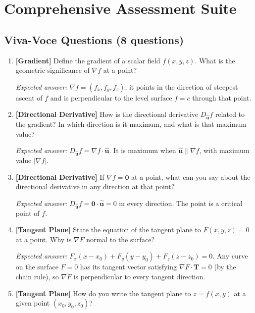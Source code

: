 \documentclass[12pt,a4paper]{article}
\begin{document}
\section{Comprehensive Assessment Suite}

\subsection*{Viva-Voce Questions (8 questions)}

\begin{enumerate}[leftmargin=*, label=\textbf{Q\arabic*.}]
  \item \textbf{[Gradient]} Define the gradient of a scalar field $f(x,y,z)$. What is the geometric significance of $\nabla f$ at a point?

  \textit{Expected answer:} $\nabla f = (f_x, f_y, f_z)$; it points in the direction of steepest ascent of $f$ and is perpendicular to the level surface $f = c$ through that point.

  \item \textbf{[Directional Derivative]} How is the directional derivative $D_{\hat{\mathbf{u}}} f$ related to the gradient? In which direction is it maximum, and what is that maximum value?

  \textit{Expected answer:} $D_{\hat{\mathbf{u}}} f = \nabla f \cdot \hat{\mathbf{u}}$. It is maximum when $\hat{\mathbf{u}} \parallel \nabla f$, with maximum value $|\nabla f|$.

  \item \textbf{[Directional Derivative]} If $\nabla f = \mathbf{0}$ at a point, what can you say about the directional derivative in any direction at that point?

  \textit{Expected answer:} $D_{\hat{\mathbf{u}}} f = \mathbf{0} \cdot \hat{\mathbf{u}} = 0$ in every direction. The point is a critical point of $f$.

  \item \textbf{[Tangent Plane]} State the equation of the tangent plane to $F(x,y,z) = 0$ at a point. Why is $\nabla F$ normal to the surface?

  \textit{Expected answer:} $F_x(x-x_0)+F_y(y-y_0)+F_z(z-z_0)=0$. Any curve on the surface $F=0$ has its tangent vector satisfying $\nabla F \cdot \mathbf{T} = 0$ (by the chain rule), so $\nabla F$ is perpendicular to every tangent direction.

  \item \textbf{[Tangent Plane]} How do you write the tangent plane to $z = f(x,y)$ at a given point $(x_0, y_0, z_0)$?


\end{enumerate}
\end{document}
